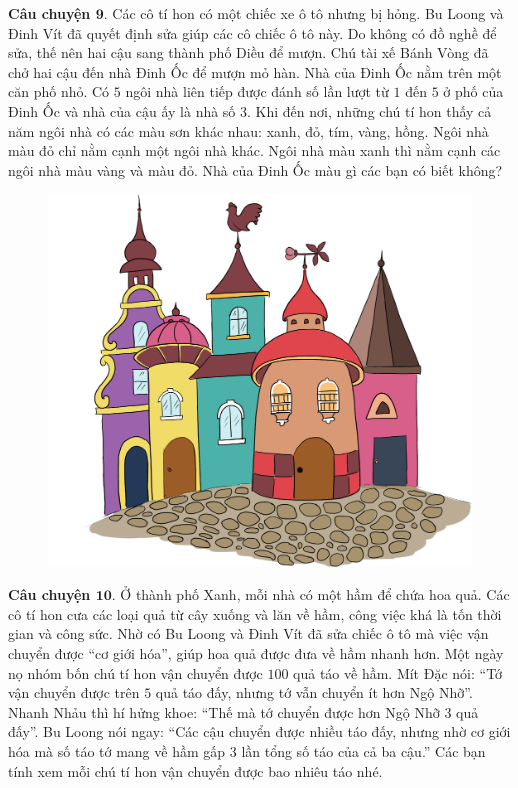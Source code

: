 	\vskip 0.1cm
	\textbf{\color{toancuabi}Câu chuyện $\pmb{9.}$} Các cô tí hon có một chiếc xe ô tô nhưng bị hỏng. Bu Loong và Đinh Vít đã quyết định sửa giúp các cô chiếc ô tô này. Do  không có đồ nghề để sửa, thế nên hai cậu sang thành phố Diều để mượn. Chú tài xế Bánh Vòng đã chở hai cậu đến nhà Đinh Ốc để mượn mỏ hàn. Nhà của Đinh Ốc nằm trên một căn phố nhỏ. Có $5$ ngôi nhà liên tiếp được đánh số lần lượt từ $1$ đến $5$ ở phố của Đinh Ốc và nhà của cậu ấy là nhà số $3$. Khi đến nơi, những chú tí hon thấy cả năm ngôi nhà có các màu sơn khác nhau: xanh, đỏ, tím, vàng, hồng. Ngôi nhà màu đỏ chỉ nằm cạnh một ngôi nhà khác. Ngôi nhà màu xanh thì nằm cạnh các ngôi nhà màu vàng và màu đỏ. Nhà của Đinh Ốc màu gì các bạn có biết không?
		\begin{figure}[H]
		\centering
		\vspace*{-5pt}
		\captionsetup{labelformat= empty, justification=centering}
		\includegraphics[width=0.6\linewidth]{Hinh24_NhaDinhOc}
		\vspace*{-10pt}
	\end{figure}
	\textbf{\color{toancuabi}Câu chuyện $\pmb{10.}$} Ở thành phố Xanh, mỗi nhà có một hầm để chứa hoa quả. Các cô tí hon cưa các loại quả từ cây xuống và lăn về hầm, công việc khá là tốn thời gian và công sức. Nhờ có Bu Loong và Đinh Vít đã sửa chiếc ô tô mà việc vận chuyển được “cơ giới hóa”, giúp hoa quả được đưa về hầm nhanh hơn. Một ngày nọ nhóm bốn chú tí hon vận chuyển được $100$ quả táo về hầm. Mít Đặc nói: “Tớ vận chuyển được trên $5$ quả táo đấy, nhưng tớ vẫn chuyển ít hơn Ngộ Nhỡ”. Nhanh Nhảu thì hí hửng khoe: “Thế mà tớ chuyển được hơn Ngộ Nhỡ $3$ quả đấy”. Bu Loong nói ngay: “Các cậu chuyển được nhiều táo đấy, nhưng nhờ cơ giới hóa mà số táo tớ mang về hầm gấp $3$ lần tổng số táo của cả ba cậu.” Các bạn tính xem mỗi chú tí hon vận chuyển được bao nhiêu táo nhé.
